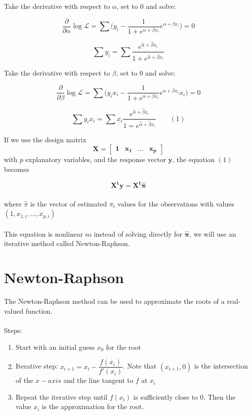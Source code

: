 \documentclass{article}
\begin{document}
\noindent Take the derivative with respect to $\alpha$, set to $0$ and solve:

$$
\dfrac{\partial}{\partial \alpha} \log \mathscr{L} = \sum \big(y_i - \dfrac{1}{1 + e^{\alpha + \beta x_i}}e^{\alpha + \beta x_i}\big) = 0
$$

$$
\sum y_i = \sum \dfrac{e^{\hat{\alpha} + \hat{\beta}x_i}}{1 + e^{\hat{\alpha} + \hat{\beta}x_i}}
$$

\noindent Take the derivative with respect to $\beta$, set to $0$ and solve:

$$
\dfrac{\partial}{\partial \beta} \log \mathscr{L} = \sum \big(y_i x_i - \dfrac{1}{1 + e^{\alpha + \beta x_i}}e^{\alpha + \beta x_i}x_i\big) = 0
$$

$$
\sum y_i x_i = \sum x_i \dfrac{e^{\hat{\alpha} + \hat{\beta} x_i}}{1 = e^{\hat{\alpha} + \hat{\beta} x_i}} \quad \quad (1)
$$

\noindent If we use the design matrix
$$
\boldsymbol{X} = \begin{bmatrix}
    \boldsymbol{1}       & \boldsymbol{x_1} & \dots & \boldsymbol{x_p}
\end{bmatrix}
$$
with $p$ explanatory variables, and the response vector $\boldsymbol{y}$, the equation $(1)$ becomes

$$
\boldsymbol{X^t y} = \boldsymbol{X^t \hat{\pi}}
$$
\\
where $\hat{\pi}$ is the vector of estimated $\pi_i$ values for the observations with values $(1, x_{1,i}, \ldots, x_{p,i})$ 
\\\\
This equation is nonlinear so instead of solving directly for $\boldsymbol{\hat{\pi}}$, we will use an iterative method called Newton-Raphson.

\section{Newton-Raphson}

The Newton-Raphson method can be used to approximate the roots of a real-valued function. \\\\
Steps:
\begin{enumerate}
    \item Start with an initial guess $x_0$ for the root
    \item Iterative step: $x_{i+1} = x_i - \dfrac{f(x_i)}{f'(x_i)}$. Note that $(x_{i+1}, 0)$ is the intersection of the $x-axis$ and the line tangent to $f$ at $x_i$
    \item Repeat the iterative step until $f(x_i)$ is sufficiently close to $0$. Then the value $x_i$ is the approximation for the root.
\end{enumerate}
\end{document}
